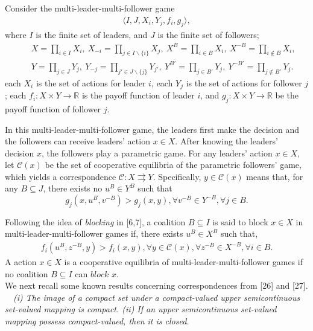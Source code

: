 Consider the multi-leader-multi-follower game
\begin{eqnarray*}
\langle I,J,X_i,Y_j,f_i,g_j\rangle,
\end{eqnarray*}
where $I$ is the finite set of leaders, and $J$ is
the finite set of followers;
\begin{eqnarray*}
&&X = \prod_{i\in I}X_i,\ X_{-i}=\prod_{j\in I\backslash\{i\}}X_j,\ X^B=\prod_{i\in B}X_i,\ X^{-B}=\prod_{i\not\in B}X_i,\\
&&Y = \prod_{j\in J}Y_j,\ Y_{-j}=\prod_{j'\in J\backslash\{j\}}Y_{j'},\ Y^{B'}=\prod_{j\in B'}Y_j,\ Y^{-B'}=\prod_{j\not\in B'}Y_j.
\end{eqnarray*}
each $X_i$ is the set of actions for leader $i$,
each $Y_j$ is the set of actions for follower $j$;
each $f_i:X\times Y\longrightarrow \mathbb{R}$ is the payoff function of leader $i$, and
$g_j:X\times Y\longrightarrow \mathbb{R}$ be the payoff function of follower $j$.

In this multi-leader-multi-follower game,
the leaders first  make the decision and
the followers can receive leaders' action $x\in X$.
After knowing the leaders' decision $x$, the followers play
a parametric game.  For any leaders' action $x\in X$, let $\mathcal{C}(x)$
be the set of cooperative equilibria of the parametric followers' game, which
yields a correspondence $\mathcal{C}:X\rightrightarrows Y$. Specifically,
${y}\in \mathcal{C}(x)$ means that, for any $B\subseteq J$, there exists no $u^B\in Y^B$ such that
$$g_j(x,u^B,v^{-B})>g_j(x,y),\forall v^{-B}\in Y^{-B},\forall j\in B.$$

Following the idea of {\it blocking} in [6,7],
a coalition $B\subseteq I$ is said to block $x\in X$ in
multi-leader-multi-follower games if, there exists $u^B\in X^B$ such that,
\begin{eqnarray*}
f_i(u^B,z^{-B},y)>f_i(x,y),\forall y\in \mathcal{C}(x),\forall z^{-B}\in X^{-B},\forall i\in B.
\end{eqnarray*}
A action $x\in X$ is a cooperative equilibria of
multi-leader-multi-follower games if no coalition $B\subseteq I$ can $block$ $x$.
\\

We next recall some known results concerning correspondences from [26] and [27].
\\

~~{\it (i) The image of a compact set under
a compact-valued upper semicontinuous set-valued
mapping is compact. (ii) If an upper semicontinuous set-valued mapping possess compact-valued, then it is closed.}
\\



